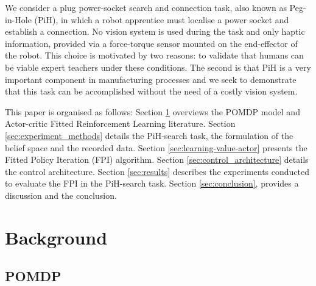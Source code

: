 \documentclass[final,5p,times,twocolumn]{elsarticle}
\begin{document}
We consider a plug power-socket search and connection task, also known as Peg-in-Hole (PiH), in which a 
robot apprentice must localise a power socket and establish a connection. 
No vision system is used during the task and only haptic information, provided via 
a force-torque sensor mounted on the end-effector of the robot. This choice is motivated by two reasons:
to validate that humans can be viable expert teachers under these conditions. The second is that PiH is a very important component 
in manufacturing processes and we seek to demonstrate that this task can be accomplished without the need of
a costly vision system. 

This paper is organised as follows: Section \ref{sec:related_work} overviews the POMDP model and Actor-critic Fitted Reinforcement 
Learning literature. Section \ref{sec:experiment_methods} details the PiH-search task, the formulation of the belief space and the recorded data. Section \ref{sec:learning-value-actor} presents the Fitted Policy Iteration (FPI) algorithm.
Section \ref{sec:control_architecture} details the control architecture. Section \ref{sec:results} describes the experiments 
conducted to evaluate the FPI in the PiH-search task. Section \ref{sec:conclusion}, provides a discussion and the conclusion.


\section{Background}\label{sec:related_work}

\subsection{POMDP}
\end{document}
